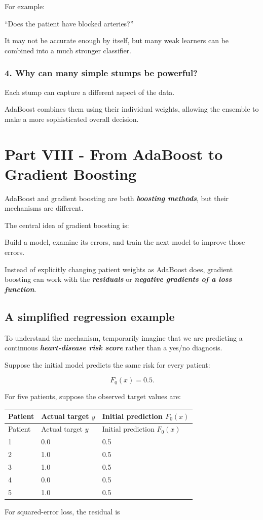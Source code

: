 \documentclass[10pt]{article}
\begin{document}
For example:

``Does the patient have blocked arteries?''

It may not be accurate enough by itself, but many weak learners can be combined into a much stronger classifier.

\subsubsection*{4. Why can many simple stumps be powerful?}
Each stump can capture a different aspect of the data.

AdaBoost combines them using their individual weights, allowing the ensemble to make a more sophisticated overall decision.

\par\endgroup

\clearpage
\section*{Part VIII - From AdaBoost to Gradient Boosting}
AdaBoost and gradient boosting are both \textbf{\textit{boosting methods}}, but their mechanisms are different.

The central idea of gradient boosting is:

Build a model, examine its errors, and train the next model to improve those errors.

Instead of explicitly changing patient weights as AdaBoost does, gradient boosting can work with the \textbf{\textit{residuals}} or \textbf{\textit{negative gradients of a loss function}}.

\subsection*{A simplified regression example}
To understand the mechanism, temporarily imagine that we are predicting a continuous \textbf{\textit{heart-disease risk score}} rather than a yes/no diagnosis.

Suppose the initial model predicts the same risk for every patient:

\[
F_0(x)=0.5.
\]

For five patients, suppose the observed target values are:

\begingroup
\small
\setlength{\tabcolsep}{4pt}
\begin{longtable}{l|l|l}
Patient & Actual target $y$ & Initial prediction $F_0(x)$ \\[1.5pt]
\hline
\endfirsthead
Patient & Actual target $y$ & Initial prediction $F_0(x)$ \\[1.5pt]
\hline
\endhead
1 & 0.0 & 0.5 \\[1.5pt]
2 & 1.0 & 0.5 \\[1.5pt]
3 & 1.0 & 0.5 \\[1.5pt]
4 & 0.0 & 0.5 \\[1.5pt]
5 & 1.0 & 0.5 \\[1.5pt]
\end{longtable}
\endgroup
For squared-error loss, the residual is
\end{document}
